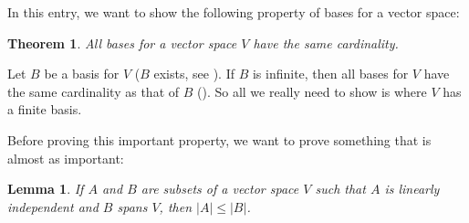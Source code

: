 \documentclass[12pt]{article}
\newtheorem{thm}{Theorem}
\newtheorem{lem}{Lemma}
\begin{document}
In this entry, we want to show the following property of bases for a vector space:

\begin{thm} All bases for a vector space $V$ have the same cardinality. \end{thm}

Let $B$ be a basis for $V$ ($B$ exists, see ).  If $B$ is infinite, then all bases for $V$ have the same cardinality as that of $B$ ().  So all we really need to show is where $V$ has a finite basis.

Before proving this important property, we want to prove something that is almost as important:

\begin{lem} If $A$ and $B$ are subsets of a vector space $V$ such that $A$ is linearly independent and $B$ spans $V$, then $|A|\le |B|$. \end{lem}
\end{document}
